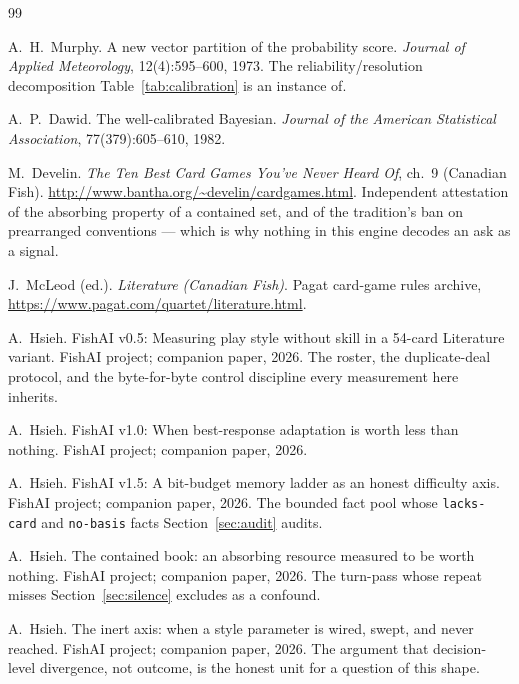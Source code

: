 \documentclass[11pt]{article}
\newcommand{\code}[1]{\texttt{#1}}
\begin{document}
\begin{thebibliography}{99}
\footnotesize

A.~H.~Murphy.
\newblock A new vector partition of the probability score.
\newblock \emph{Journal of Applied Meteorology}, 12(4):595--600, 1973.
The reliability/resolution decomposition Table~\ref{tab:calibration} is an instance of.

A.~P.~Dawid.
\newblock The well-calibrated Bayesian.
\newblock \emph{Journal of the American Statistical Association}, 77(379):605--610, 1982.

M.~Develin.
\newblock \emph{The Ten Best Card Games You've Never Heard Of}, ch.~9 (Canadian Fish).
\newblock \url{http://www.bantha.org/~develin/cardgames.html}.
Independent attestation of the absorbing property of a contained set, and of the tradition's
ban on prearranged conventions --- which is why nothing in this engine decodes an ask as a
signal.

J.~McLeod (ed.).
\newblock \emph{Literature (Canadian Fish)}.
\newblock Pagat card-game rules archive,
\url{https://www.pagat.com/quartet/literature.html}.

A.~Hsieh.
\newblock FishAI v0.5: Measuring play style without skill in a 54-card Literature
variant.
\newblock FishAI project; companion paper, 2026. The roster, the duplicate-deal protocol,
and the byte-for-byte control discipline every measurement here inherits.

A.~Hsieh.
\newblock FishAI v1.0: When best-response adaptation is worth less than nothing.
\newblock FishAI project; companion paper, 2026.

A.~Hsieh.
\newblock FishAI v1.5: A bit-budget memory ladder as an honest difficulty axis.
\newblock FishAI project; companion paper, 2026. The bounded fact pool whose
\code{lacks-card} and \code{no-basis} facts Section~\ref{sec:audit} audits.

A.~Hsieh.
\newblock The contained book: an absorbing resource measured to be worth nothing.
\newblock FishAI project; companion paper, 2026. The turn-pass whose repeat misses
Section~\ref{sec:silence} excludes as a confound.

A.~Hsieh.
\newblock The inert axis: when a style parameter is wired, swept, and never reached.
\newblock FishAI project; companion paper, 2026. The argument that decision-level
divergence, not outcome, is the honest unit for a question of this shape.


\end{thebibliography}
\end{document}
